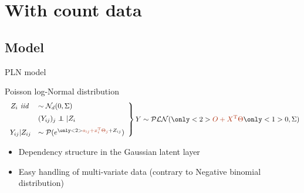 \documentclass[9pt]{beamer}
\newcommand{\emphase}[1]{\textcolor{Complement}{#1}}
\newcommand\independent{\protect\mathpalette{\protect\independenT}{\perp}}\def\independenT#1#2{\mathrel{\rlap{$#1#2$}\mkern2mu{#1#2}}}
\begin{document}
\section{With count data}
\subsection{Model}


\begin{frame}{PLN model}
\begin{block}{Poisson log-Normal distribution \cite{AiH89}}
\[
            \left.
                \begin{array}{rl}
               \vspace{0.2cm}    Z_i \textit{ iid } &\sim \mathcal{N}_{d}(0,\Sigma)\\
              \vspace{0.2cm}    &(Y_{ij})_j \independent |Z_i\\
                    Y_{ij}|Z_{ij} &\sim \mathcal{P}(e^{\only<2>{\emphase{o_{ij}+x_i^{\text{T}}\Theta_j} +}Z_{ij}}) 
                   
                \end{array}
            \right \} Y \sim \mathcal{PLN}(\only<2>{\emphase{O+X^{\text{T}}\Theta }}\only<1>{0}, \Sigma)  
            \]
\end{block}

\begin{itemize}
    \item Dependency structure in the Gaussian latent layer
    \item Easy handling of multi-variate data (contrary to Negative binomial distribution)
\end{itemize}

\end{frame}
\end{document}
